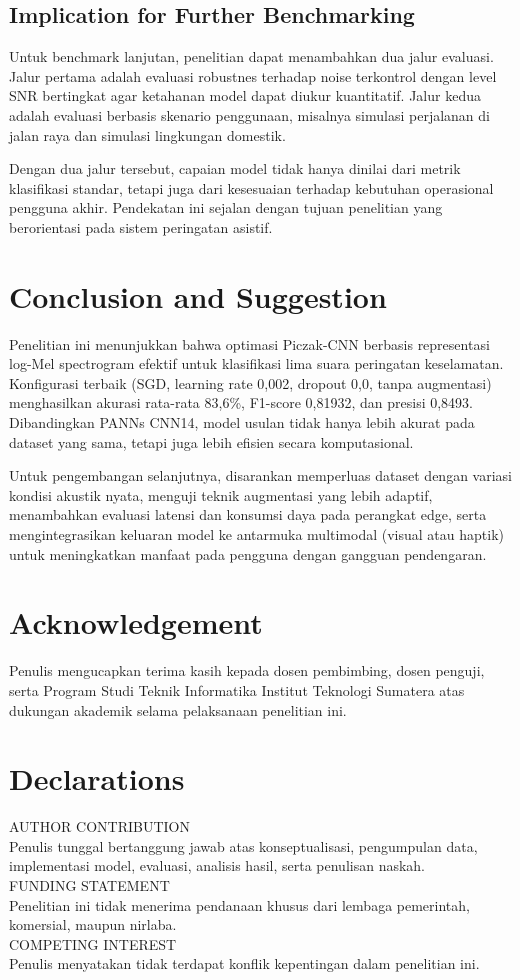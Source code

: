 \documentclass[10pt,a4paper]{jurnalvarian}
\let\LaTeXsection\section
\let\LaTeXsubsection\subsection
\def\section{\setlength{\leftskip}{0cm}\LaTeXsection}
\def\subsection{\setlength{\leftskip}{0.6cm}\LaTeXsubsection}
\begin{document}
\subsection{Implication for Further Benchmarking}
Untuk benchmark lanjutan, penelitian dapat menambahkan dua jalur evaluasi. Jalur pertama adalah evaluasi robustnes terhadap noise terkontrol dengan level SNR bertingkat agar ketahanan model dapat diukur kuantitatif. Jalur kedua adalah evaluasi berbasis skenario penggunaan, misalnya simulasi perjalanan di jalan raya dan simulasi lingkungan domestik.

Dengan dua jalur tersebut, capaian model tidak hanya dinilai dari metrik klasifikasi standar, tetapi juga dari kesesuaian terhadap kebutuhan operasional pengguna akhir. Pendekatan ini sejalan dengan tujuan penelitian yang berorientasi pada sistem peringatan asistif.

\section{Conclusion and Suggestion}
Penelitian ini menunjukkan bahwa optimasi Piczak-CNN berbasis representasi log-Mel spectrogram efektif untuk klasifikasi lima suara peringatan keselamatan. Konfigurasi terbaik (SGD, learning rate 0{,}002, dropout 0{,}0, tanpa augmentasi) menghasilkan akurasi rata-rata 83{,}6\%, F1-score 0{,}81932, dan presisi 0{,}8493. Dibandingkan PANNs CNN14, model usulan tidak hanya lebih akurat pada dataset yang sama, tetapi juga lebih efisien secara komputasional.

Untuk pengembangan selanjutnya, disarankan memperluas dataset dengan variasi kondisi akustik nyata, menguji teknik augmentasi yang lebih adaptif, menambahkan evaluasi latensi dan konsumsi daya pada perangkat edge, serta mengintegrasikan keluaran model ke antarmuka multimodal (visual atau haptik) untuk meningkatkan manfaat pada pengguna dengan gangguan pendengaran.

\section*{Acknowledgement}
Penulis mengucapkan terima kasih kepada dosen pembimbing, dosen penguji, serta Program Studi Teknik Informatika Institut Teknologi Sumatera atas dukungan akademik selama pelaksanaan penelitian ini.

\section*{Declarations}
AUTHOR CONTRIBUTION\\
Penulis tunggal bertanggung jawab atas konseptualisasi, pengumpulan data, implementasi model, evaluasi, analisis hasil, serta penulisan naskah.\\

FUNDING STATEMENT\\
Penelitian ini tidak menerima pendanaan khusus dari lembaga pemerintah, komersial, maupun nirlaba.\\

COMPETING INTEREST\\
Penulis menyatakan tidak terdapat konflik kepentingan dalam penelitian ini.

\printbibliography
\end{document}
